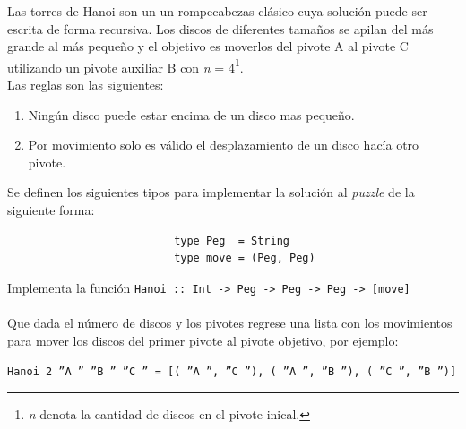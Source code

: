     \begin{exercise}
        Las torres de Hanoi son un un rompecabezas clásico cuya solución puede ser escrita de forma recursiva. Los discos de diferentes tamaños se apilan del más grande al más pequeño y el objetivo es moverlos del pivote A al pivote C utilizando un pivote auxiliar B con \textit{n} = 4\footnote{\textit{n} denota la cantidad de discos en el pivote inical.}.\\
        
        Las reglas son  las siguientes: \\
        
        \begin{enumerate}
            \item Ningún disco puede estar encima de un disco mas pequeño. 
            \item Por movimiento solo es válido el desplazamiento de un disco hacía otro pivote.
        \end{enumerate}

        Se definen los siguientes tipos para implementar la solución al \textit{puzzle} de la siguiente forma: 

        \begin{center}
            \begin{verbatim}
                          type Peg  = String
                          type move = (Peg, Peg)
            \end{verbatim}
        \end{center}
        

        Implementa la función \texttt{Hanoi :: Int ->\ Peg ->\ Peg ->\ Peg ->\ [move]}\\\\
        Que dada el número de discos y los pivotes regrese una lista con los movimientos para mover los discos del primer pivote al pivote objetivo, por ejemplo: \\
        \begin{center}
            \texttt{Hanoi 2  ''A ''  ''B ''  ''C '' = [( ''A '', ''C ''), ( ''A '', ''B ''), ( ''C '', ''B '')]}
        \end{center}
    \end{exercise}  

    \newpage
    \newpage

